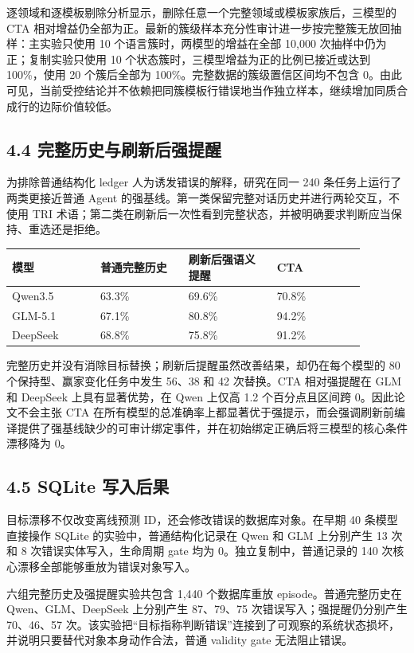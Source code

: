 \documentclass[10.5pt,fontset=none]{ctexart}
\begin{document}
\par 逐领域和逐模板剔除分析显示，删除任意一个完整领域或模板家族后，三模型的 CTA 相对增益仍全部为正。最新的簇级样本充分性审计进一步按完整簇无放回抽样：主实验只使用 10 个语言簇时，两模型的增益在全部 10,000 次抽样中仍为正；复制实验只使用 10 个状态簇时，三模型增益为正的比例已接近或达到 100\%，使用 20 个簇后全部为 100\%。完整数据的簇级置信区间均不包含 0。由此可见，当前受控结论并不依赖把同簇模板行错误地当作独立样本，继续增加同质合成行的边际价值较低。
\subsection{4.4 完整历史与刷新后强提醒}
\par 为排除普通结构化 ledger 人为诱发错误的解释，研究在同一 240 条任务上运行了两类更接近普通 Agent 的强基线。第一类保留完整对话历史并进行两轮交互，不使用 TRI 术语；第二类在刷新后一次性看到完整状态，并被明确要求判断应当保持、重选还是拒绝。
\begin{longtable}{@{}p{0.220\linewidth} p{0.220\linewidth} p{0.220\linewidth} p{0.220\linewidth}@{}}
\toprule
模型 & 普通完整历史 & 刷新后强语义提醒 & CTA \\
\midrule\endhead
Qwen3.5 & 63.3\% & 69.6\% & 70.8\% \\
GLM-5.1 & 67.1\% & 80.8\% & 94.2\% \\
DeepSeek & 68.8\% & 75.8\% & 91.2\% \\
\bottomrule
\end{longtable}

\par 完整历史并没有消除目标替换；刷新后提醒虽然改善结果，却仍在每个模型的 80 个保持型、赢家变化任务中发生 56、38 和 42 次替换。CTA 相对强提醒在 GLM 和 DeepSeek 上具有显著优势，在 Qwen 上仅高 1.2 个百分点且区间跨 0。因此论文不会主张 CTA 在所有模型的总准确率上都显著优于强提示，而会强调刷新前编译提供了强基线缺少的可审计绑定事件，并在初始绑定正确后将三模型的核心条件漂移降为 0。
\subsection{4.5 SQLite 写入后果}
\par 目标漂移不仅改变离线预测 ID，还会修改错误的数据库对象。在早期 40 条模型直接操作 SQLite 的实验中，普通结构化记录在 Qwen 和 GLM 上分别产生 13 次和 8 次错误实体写入，生命周期 gate 均为 0。独立复制中，普通记录的 140 次核心漂移全部能够重放为错误对象写入。
\par 六组完整历史及强提醒实验共包含 1,440 个数据库重放 episode。普通完整历史在 Qwen、GLM、DeepSeek 上分别产生 87、79、75 次错误写入；强提醒仍分别产生 70、46、57 次。该实验把“目标指称判断错误”连接到了可观察的系统状态损坏，并说明只要替代对象本身动作合法，普通 validity gate 无法阻止错误。
\end{document}
